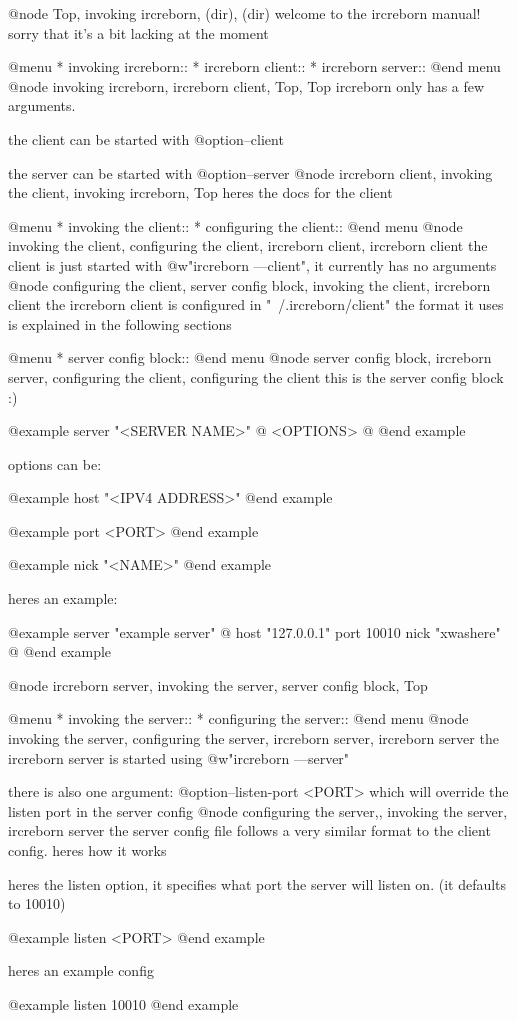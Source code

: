 
@node Top, invoking ircreborn, (dir), (dir)
welcome to the ircreborn manual! sorry that it's a bit lacking at the moment

@menu
* invoking ircreborn::
* ircreborn client::
* ircreborn server::
@end menu
@node invoking ircreborn, ircreborn client, Top, Top
ircreborn only has a few arguments.

the client can be started with @option{--client}

the server can be started with @option{--server}
@node ircreborn client, invoking the client, invoking ircreborn, Top
heres the docs for the client

@menu
* invoking the client::
* configuring the client::
@end menu
@node invoking the client, configuring the client, ircreborn client, ircreborn client
the client is just started with @w{"ircreborn ---client"}, it currently has no arguments
@node configuring the client, server config block, invoking the client, ircreborn client
the ircreborn client is configured in "~/.ircreborn/client"
the format it uses is explained in the following sections

@menu
* server config block::
@end menu
@node server config block, ircreborn server, configuring the client, configuring the client
this is the server config block :)

@example
server "<SERVER NAME>" @{
    <OPTIONS>
@}
@end example

options can be:

@example
host "<IPV4 ADDRESS>"
@end example

@example
port <PORT>
@end example

@example
nick "<NAME>"
@end example

heres an example:

@example
server "example server" @{
    host "127.0.0.1"
    port 10010
    nick "xwashere"
@}
@end example

@node ircreborn server, invoking the server, server config block, Top

@menu
* invoking the server::
* configuring the server::
@end menu
@node invoking the server, configuring the server, ircreborn server, ircreborn server
the ircreborn server is started using @w{"ircreborn ---server"}

there is also one argument: @option{--listen-port <PORT>} which will override the listen port in the server config
@node configuring the server,, invoking the server, ircreborn server
the server config file follows a very similar format to the client config. heres how it works

heres the listen option, it specifies what port the server will listen on. (it defaults to 10010)

@example
listen <PORT>
@end example

heres an example config

@example
listen 10010
@end example
